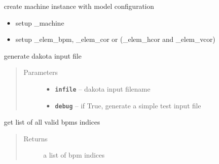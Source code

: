 \documentclass[letterpaper,10pt,english]{sphinxmanual}
\begin{document}
\begin{fulllineitems}

\begin{fulllineitems}
\label{src/apidocs/genopt:genopt.DakotaOC.create_machine}
create machine instance with model configuration
\begin{itemize}
\item {} 
setup \_machine

\item {} 
setup \_elem\_bpm, \_elem\_cor or (\_elem\_hcor and \_elem\_vcor)

\end{itemize}

\end{fulllineitems}


\begin{fulllineitems}
\label{src/apidocs/genopt:genopt.DakotaOC.gen_dakota_input}
generate dakota input file
\begin{quote}\begin{description}
\item[{Parameters}] \leavevmode\begin{itemize}
\item {} 
\textbf{\texttt{infile}} -- dakota input filename

\item {} 
\textbf{\texttt{debug}} -- if True, generate a simple test input file

\end{itemize}

\end{description}\end{quote}

\end{fulllineitems}


\begin{fulllineitems}
\label{src/apidocs/genopt:genopt.DakotaOC.get_all_bpms}
get list of all valid bpms indices
\begin{quote}\begin{description}
\item[{Returns}] \leavevmode
a list of bpm indices


\end{description}
\end{quote}
\end{fulllineitems}
\end{fulllineitems}
\end{document}
